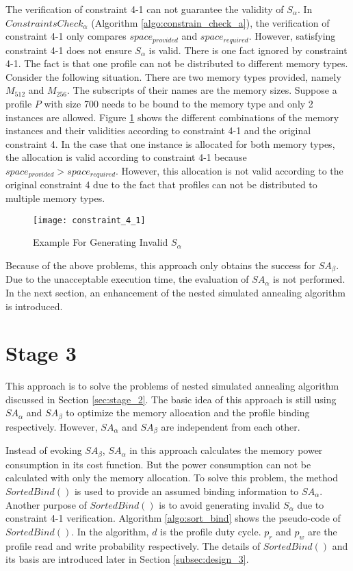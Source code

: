 		The verification of constraint 4-1 can not guarantee the validity of $S_{\alpha}$.
		In $ConstraintsCheck_{\alpha}$ (Algorithm \ref{algo:constrain_check_a}),
		the verification of constraint 4-1 only compares $space_{provided}$ and
		$space_{required}$. However, satisfying constraint 4-1 does not ensure $S_{\alpha}$
		is valid. There is one fact ignored by constraint 4-1. The fact is that one profile
		can not be distributed to different memory types. Consider the following situation.
		There are two memory types provided, namely $M_{512}$ and $M_{256}$. The subscripts
		of their names are the memory sizes. Suppose a profile $P$ with size 700 needs to
		be bound to the memory type and only 2 instances are allowed.
		Figure \ref{fig:cons_4_1_invalid} shows the different combinations of the memory
		instances and their validities according to constraint 4-1 and the original
		constraint 4. In the case that one instance is allocated for both memory types,
		the allocation is valid according to constraint 4-1 because
		$space_{provided} > space_{required}$. However, this allocation is not valid
		according to the original constraint 4 due to the fact that profiles can not
		be distributed to multiple memory types.
		\begin{figure}[h]
			\begin{center}
				\texttt{[image: constraint\_4\_1]}
				\caption{Example For Generating Invalid $S_{\alpha}$}
				\label{fig:cons_4_1_invalid}
			\end{center}
		\end{figure}
	
		Because of the above problems, this approach only obtains the success for
		$SA_{\beta}$. Due to the unacceptable execution time, the
		evaluation of $SA_{\alpha}$ is not performed.
		In the next section, an enhancement of the nested simulated
		annealing algorithm is introduced.
		
	\section{Stage 3}
	\label{sec:stage_3}
	This approach is to solve the problems of nested simulated annealing algorithm
	discussed in Section \ref{sec:stage_2}. The basic idea of this approach is
	still using $SA_{\alpha}$ and $SA_{\beta}$ to optimize the memory allocation
	and the profile binding respectively. However, $SA_{\alpha}$ and $SA_{\beta}$
	are independent from each other.
	
	Instead of evoking $SA_{\beta}$, $SA_{\alpha}$ in this approach calculates
	the memory power consumption in its cost function.
	But the power consumption can not be calculated with only the memory
	allocation.
	To solve this problem, the method $SortedBind()$ is used to
	provide an assumed binding information to $SA_{\alpha}$.
	Another purpose of $SortedBind()$ is to avoid generating invalid $S_{\alpha}$
	due to constraint 4-1 verification.
	Algorithm \ref{algo:sort_bind} shows the pseudo-code of $SortedBind()$.
	In the algorithm, $d$ is the profile duty cycle.
	$p_{r}$ and $p_{w}$ are the profile read and write probability respectively.
	The details of $SortedBind()$ and its basis are introduced later in Section
	\ref{subsec:design_3}.
	
	
